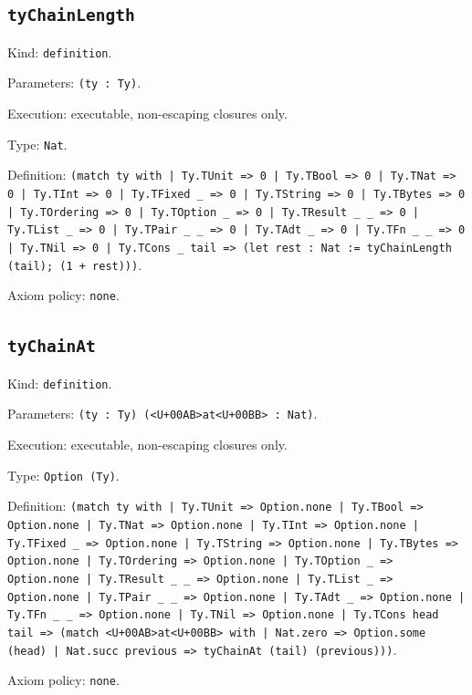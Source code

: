 \documentclass[11pt]{article}
\begin{document}
\subsection*{\texttt{tyChainLength}}
\noindent Kind: \texttt{definition}.\par
\noindent Parameters: \texttt{(ty : Ty)}.\par
\noindent Execution: executable, non-escaping closures only.\par
\noindent Type: \texttt{Nat}.\par
\noindent Definition: \texttt{(match ty with | Ty.TUnit => 0 | Ty.TBool => 0 | Ty.TNat => 0 | Ty.TInt => 0 | Ty.TFixed \_ => 0 | Ty.TString => 0 | Ty.TBytes => 0 | Ty.TOrdering => 0 | Ty.TOption \_ => 0 | Ty.TResult \_ \_ => 0 | Ty.TList \_ => 0 | Ty.TPair \_ \_ => 0 | Ty.TAdt \_ => 0 | Ty.TFn \_ \_ => 0 | Ty.TNil => 0 | Ty.TCons \_ tail => (let rest : Nat := tyChainLength (tail); (1 + rest)))}.\par
\noindent Axiom policy: \texttt{none}.\par
\subsection*{\texttt{tyChainAt}}
\noindent Kind: \texttt{definition}.\par
\noindent Parameters: \texttt{(ty : Ty) (<U+00AB>at<U+00BB> : Nat)}.\par
\noindent Execution: executable, non-escaping closures only.\par
\noindent Type: \texttt{Option (Ty)}.\par
\noindent Definition: \texttt{(match ty with | Ty.TUnit => Option.none | Ty.TBool => Option.none | Ty.TNat => Option.none | Ty.TInt => Option.none | Ty.TFixed \_ => Option.none | Ty.TString => Option.none | Ty.TBytes => Option.none | Ty.TOrdering => Option.none | Ty.TOption \_ => Option.none | Ty.TResult \_ \_ => Option.none | Ty.TList \_ => Option.none | Ty.TPair \_ \_ => Option.none | Ty.TAdt \_ => Option.none | Ty.TFn \_ \_ => Option.none | Ty.TNil => Option.none | Ty.TCons head tail => (match <U+00AB>at<U+00BB> with | Nat.zero => Option.some (head) | Nat.succ previous => tyChainAt (tail) (previous)))}.\par
\noindent Axiom policy: \texttt{none}.\par
\end{document}
